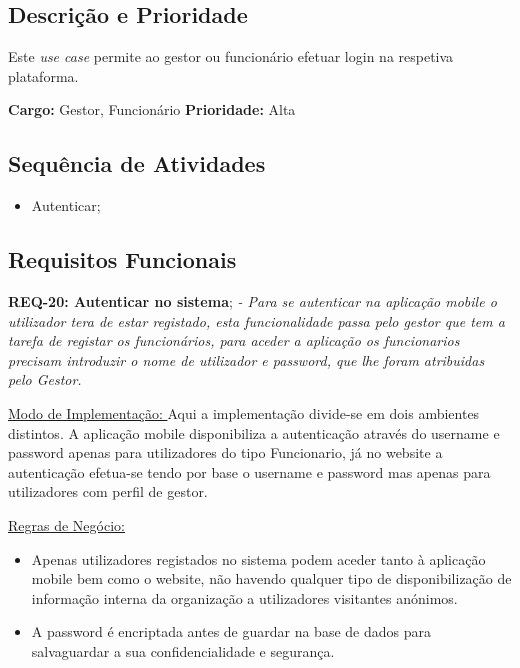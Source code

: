 \documentclass{scrreprt}
\begin{document}
	\subsection{Descrição e Prioridade}
	
	Este \textit{use case} permite ao gestor ou funcionário efetuar login na respetiva plataforma.
	
	\textbf{Cargo: }Gestor, Funcionário  \newline
	\textbf{Prioridade: }Alta \newline
	
	\subsection{Sequência de Atividades}
	
	\begin{itemize}
		\item Autenticar;
	\end{itemize}
	
	\subsection{Requisitos Funcionais}
	\textbf{REQ-20: Autenticar no sistema};\newline
	    \textit{- Para se autenticar na aplicação mobile o utilizador tera de estar registado, esta funcionalidade passa pelo gestor que tem a tarefa de registar os funcionários, para aceder a aplicação os funcionarios precisam introduzir o nome de utilizador e password, que lhe foram atribuidas pelo Gestor.}\newline\newline
	    
    	 \underline{Modo de Implementação: }Aqui a implementação divide-se em dois ambientes distintos. A aplicação mobile disponibiliza a autenticação através do username e password apenas para utilizadores do tipo Funcionario, já no website a autenticação efetua-se tendo por base o username e password mas apenas para utilizadores com perfil de gestor.\newline
	
    	\underline{Regras de Negócio: }
    		\begin{itemize}
    		\item  Apenas utilizadores registados no sistema podem aceder tanto à aplicação mobile bem como o website, não havendo qualquer tipo de disponibilização de informação interna da organização a utilizadores visitantes anónimos.
    		\item A password é encriptada antes de guardar na base de dados para salvaguardar a sua confidencialidade e segurança.
    	\end{itemize}
	
\end{document}
